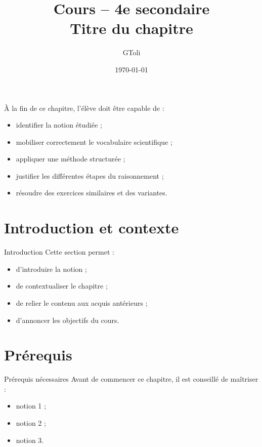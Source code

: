 \documentclass[11pt,a4paper]{article}
\title{\textbf{Cours -- 4e secondaire}\\[0.2cm]
\large Titre du chapitre}
\author{GToli}
\date{\today}
\begin{document}
\maketitle


\begin{cadreobjectif}
À la fin de ce chapitre, l’élève doit être capable de :
\begin{itemize}
    \item identifier la notion étudiée ;
    \item mobiliser correctement le vocabulaire scientifique ;
    \item appliquer une méthode structurée ;
    \item justifier les différentes étapes du raisonnement ;
    \item résoudre des exercices similaires et des variantes.
\end{itemize}
\end{cadreobjectif}

\section{Introduction et contexte}

\begin{cadrebleu}{Introduction}
Cette section permet :
\begin{itemize}
    \item d’introduire la notion ;
    \item de contextualiser le chapitre ;
    \item de relier le contenu aux acquis antérieurs ;
    \item d’annoncer les objectifs du cours.
\end{itemize}
\end{cadrebleu}

\section{Prérequis}

\begin{cadregris}{Prérequis nécessaires}
Avant de commencer ce chapitre, il est conseillé de maîtriser :
\begin{itemize}
    \item notion 1 ;
    \item notion 2 ;
    \item notion 3.
\end{itemize}
\end{cadregris}
\end{document}
